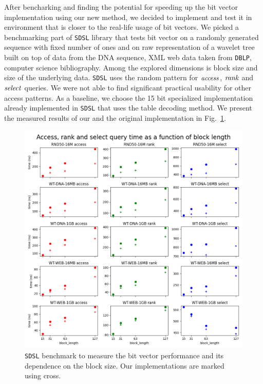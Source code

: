 After bencharking and finding the potential for speeding up the bit vector implementation using
our new method, we decided to implement and test it in environment that is closer to the real-life
usage of bit vectors. We picked a benchmarking part of \texttt{SDSL} library that tests bit vector
on a randomly generated sequence with fixed number of ones and on raw representation of a wavelet
tree built on top of data from the DNA sequence, XML web data taken from \texttt{DBLP}, computer
science bibliography. Among the explored dimensions is block size and size of the underlying data.
\texttt{SDSL} uses the random pattern for $\mathit{access}$, $\mathit{rank}$ and $\mathit{select}$ queries. We were not able
to find significant practical usability for other access patterns. As a baseline, we choose the 15
bit specialized implementation already implemented in \texttt{SDSL} that uses the table decoding
method. We present the measured results of our and the original implementation in
Fig.~\ref{obr:benchmark_sdsl_new_method}.
\begin{figure}
	\centerline{
		\includegraphics[width=\textwidth, height=0.7\textheight]{images/benchmark_sdsl_new_method}
	}
	\caption[TODO]{\texttt{SDSL} benchmark to measure the bit vector performance and its dependence
	on the block size. Our implementations are marked using cross.
	}
	\label{obr:benchmark_sdsl_new_method}
\end{figure}
